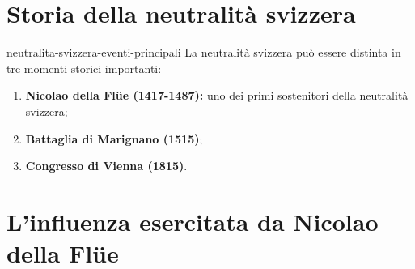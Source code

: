 \documentclass[preview]{standalone}
\begin{document}
\genpage

\section{Storia della neutralità svizzera}

\begin{snippet}{neutralita-svizzera-eventi-principali}
    La neutralità svizzera può essere distinta in tre momenti storici importanti:
    \begin{enumerate}
        \item \textbf{Nicolao della Flüe (1417-1487):} uno dei primi sostenitori della neutralità svizzera;
        \item \textbf{Battaglia di Marignano (1515)};
        \item \textbf{Congresso di Vienna (1815)}.
    \end{enumerate}
\end{snippet}

\section{L'influenza esercitata da Nicolao della Flüe}

\end{document}
